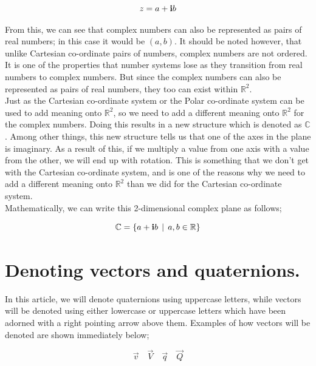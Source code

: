 \begin{equation*}
    z = a + \bm{\mathrm{i}} b
\end{equation*}
\vspace{0\baselineskip}

From this, we can see that complex numbers can also be represented as pairs of real numbers; in this case it would be
\((a,b)\). It should be noted however, that unlike Cartesian co-ordinate pairs of numbers, complex numbers are not
ordered. It is one of the properties that number systems lose as they transition from real numbers to complex numbers.
But since the complex numbers can also be represented as pairs of real numbers, they too can exist within
\(\mathbb{R}^2\). \\

Just as the Cartesian co-ordinate system or the Polar co-ordinate system can be used to add meaning onto \(\mathbb{R}^2\), so we
need to add a different meaning onto \(\mathbb{R}^2\) for the complex numbers. Doing this results in a new structure which
is denoted as \(\mathbb{C}\). Among other things, this new structure tells us that one of the axes in the plane is imaginary. As a result of
this, if we multiply a value from one axis with a value from the other, we will end up with rotation. This is something
that we don't get with the Cartesian co-ordinate system, and is one of the reasons why we need to add a different
meaning onto \(\mathbb{R}^2\) than we did for the Cartesian co-ordinate system. \\

Mathematically, we can write this 2-dimensional complex plane as follows;

\begin{equation*}
    \mathbb{C} = \left\{a + \bm{\mathrm{i}} b \;\, | \;\, a,b \in \mathbb{R} \right\}
\end{equation*}


\section{Denoting vectors and quaternions.}

In this article, we will denote quaternions using uppercase letters, while vectors will be denoted using either lowercase
or uppercase letters which have been adorned with a right pointing arrow above them. Examples of how vectors will be denoted are
shown immediately below;

\begin{equation*}
\vec{v} \quad \vec{V} \quad \vec{q} \quad \vec{Q}
\end{equation*}